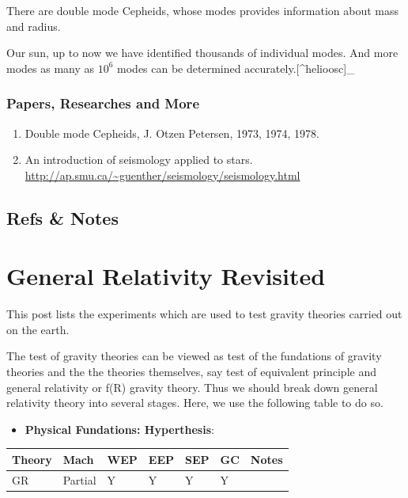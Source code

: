 \documentclass[letterpaper,10pt,english]{sphinxmanual}
\begin{document}
There are double mode Cepheids, whose modes provides information about mass and radius.

Our sun, up to now we have identified thousands of individual modes. And more modes as many as \(10^{6}\) modes can be determined accurately.{[}\textasciicircum{}helioosc{]}\_


\subsubsection{Papers, Researches and More}
\label{astrophysics:papers-researches-and-more}\begin{enumerate}
\item {} 
Double mode Cepheids, J. Otzen Petersen, 1973, 1974, 1978.

\item {} 
An introduction of seismology applied to stars. \href{http://ap.smu.ca/~guenther/seismology/seismology.html}{http://ap.smu.ca/\textasciitilde{}guenther/seismology/seismology.html}

\end{enumerate}


\subsection{Refs \& Notes}
\label{astrophysics:refs-notes}

\section{General Relativity Revisited}
\label{relativity/GeneralRelativityAdv:general-relativity-revisited}\label{relativity/GeneralRelativityAdv::doc}
This post lists the experiments which are used to test gravity theories
carried out on the earth.

The test of gravity theories can be viewed as test of the fundations of
gravity theories and the the theories themselves, say test of equivalent
principle and general relativity or f(R) gravity theory. Thus we should
break down general relativity theory into several stages. Here, we use
the following table to do so.
\begin{itemize}
\item {} 
\textbf{Physical Fundations: Hyperthesis}:

\end{itemize}

\begin{tabulary}{\linewidth}{|L|L|L|L|L|L|L|}
\hline
\textsf{\relax 
Theory
} & \textsf{\relax 
Mach
} & \textsf{\relax 
WEP
} & \textsf{\relax 
EEP
} & \textsf{\relax 
SEP
} & \textsf{\relax 
GC
} & \textsf{\relax 
Notes
}\\
\hline
GR
 & 
Partial
 & 
Y
 & 
Y
 & 
Y
 & 
Y
 & \\
\hline\end{tabulary}
\end{document}
